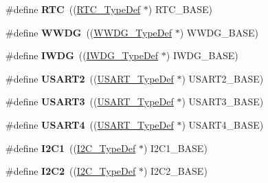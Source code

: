 \begin{DoxyCompactItemize}
\#define {\bfseries R\+TC}~((\hyperlink{struct_r_t_c___type_def}{R\+T\+C\+\_\+\+Type\+Def} $\ast$) R\+T\+C\+\_\+\+B\+A\+SE)
\item 
\mbox{\label{group___peripheral__declaration_ga9821fd01757986612ddb8982e2fe27f1}} 
\#define {\bfseries W\+W\+DG}~((\hyperlink{struct_w_w_d_g___type_def}{W\+W\+D\+G\+\_\+\+Type\+Def} $\ast$) W\+W\+D\+G\+\_\+\+B\+A\+SE)
\item 
\mbox{\label{group___peripheral__declaration_gad16b79dd94ee85d261d08a8ee94187e7}} 
\#define {\bfseries I\+W\+DG}~((\hyperlink{struct_i_w_d_g___type_def}{I\+W\+D\+G\+\_\+\+Type\+Def} $\ast$) I\+W\+D\+G\+\_\+\+B\+A\+SE)
\item 
\mbox{\label{group___peripheral__declaration_gaf114a9eab03ca08a6fb720e511595930}} 
\#define {\bfseries U\+S\+A\+R\+T2}~((\hyperlink{struct_u_s_a_r_t___type_def}{U\+S\+A\+R\+T\+\_\+\+Type\+Def} $\ast$) U\+S\+A\+R\+T2\+\_\+\+B\+A\+SE)
\item 
\mbox{\label{group___peripheral__declaration_ga2350115553c1fe0a7bc14e6a7ec6a225}} 
\#define {\bfseries U\+S\+A\+R\+T3}~((\hyperlink{struct_u_s_a_r_t___type_def}{U\+S\+A\+R\+T\+\_\+\+Type\+Def} $\ast$) U\+S\+A\+R\+T3\+\_\+\+B\+A\+SE)
\item 
\mbox{\label{group___peripheral__declaration_ga994759b8667e101cc1346d67833d980c}} 
\#define {\bfseries U\+S\+A\+R\+T4}~((\hyperlink{struct_u_s_a_r_t___type_def}{U\+S\+A\+R\+T\+\_\+\+Type\+Def} $\ast$) U\+S\+A\+R\+T4\+\_\+\+B\+A\+SE)
\item 
\mbox{\label{group___peripheral__declaration_gab45d257574da6fe1f091cc45b7eda6cc}} 
\#define {\bfseries I2\+C1}~((\hyperlink{struct_i2_c___type_def}{I2\+C\+\_\+\+Type\+Def} $\ast$) I2\+C1\+\_\+\+B\+A\+SE)
\item 
\mbox{\label{group___peripheral__declaration_gafa60ac20c1921ef1002083bb3e1f5d16}} 
\#define {\bfseries I2\+C2}~((\hyperlink{struct_i2_c___type_def}{I2\+C\+\_\+\+Type\+Def} $\ast$) I2\+C2\+\_\+\+B\+A\+SE)
\item 

\end{DoxyCompactItemize}

